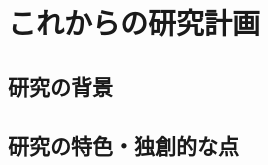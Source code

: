 \documentclass[11pt,a4paper,twoside,dvipdfmx]{jarticle}		%
\newcommand{\研究課題名}{粒子加速器を用いた電弱相互作用を持つ新物理の探索}
\newcommand{\研究機関名}{東京大学}
\newcommand{\申請者氏名}{千草颯}
\newcommand{\研究代表者氏名}{\申請者氏名}
\newcommand{\研究期間の最終元号年度}{34}	%
\begin{document}
\section{これからの研究計画}
\subsection{研究の背景}
\newcommand{\研究の背景}{%

\vspace*{1mm}

\fcolorbox{black}{my_gray}{これからの研究計画の背景}

\vspace*{1mm}

\vspace*{1mm}

\fcolorbox{black}{my_gray}{問題点と解決すべき点、着想に至った経緯等}

\vspace*{1mm}



}

\subsection{研究の特色・独創的な点}
\newcommand{\研究の特色と独創的な点}{%

\vspace*{1mm}

\fcolorbox{black}{my_gray}{特色、独創的な点}

\vspace*{1mm}

\vspace*{1mm}

\fcolorbox{black}{my_gray}{位置付け、意義}

\vspace*{1mm}


\fcolorbox{black}{my_gray}{インパクトおよび将来の見通し}

}
\end{document}
